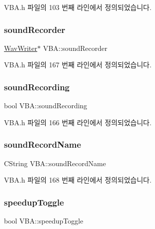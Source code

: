 V\+B\+A.\+h 파일의 103 번째 라인에서 정의되었습니다.

\mbox{\label{class_v_b_a_ae263135c638f224f26d2f2bfbd069840}} 
\subsubsection{\texorpdfstring{sound\+Recorder}{soundRecorder}}
{\footnotesize\ttfamily \mbox{\hyperlink{class_wav_writer}{Wav\+Writer}}$\ast$ V\+B\+A\+::sound\+Recorder}



V\+B\+A.\+h 파일의 167 번째 라인에서 정의되었습니다.

\mbox{\label{class_v_b_a_ae4be99a1a898dc5a3fceed0edeb0c1b0}} 
\subsubsection{\texorpdfstring{sound\+Recording}{soundRecording}}
{\footnotesize\ttfamily bool V\+B\+A\+::sound\+Recording}



V\+B\+A.\+h 파일의 166 번째 라인에서 정의되었습니다.

\mbox{\label{class_v_b_a_a11f02b69eef7e9b876a2f93d6c2f015e}} 
\subsubsection{\texorpdfstring{sound\+Record\+Name}{soundRecordName}}
{\footnotesize\ttfamily C\+String V\+B\+A\+::sound\+Record\+Name}



V\+B\+A.\+h 파일의 168 번째 라인에서 정의되었습니다.

\mbox{\label{class_v_b_a_aab299545104f6df869bf8f7abee6ef0a}} 
\subsubsection{\texorpdfstring{speedup\+Toggle}{speedupToggle}}
{\footnotesize\ttfamily bool V\+B\+A\+::speedup\+Toggle}



